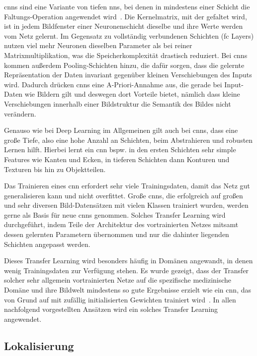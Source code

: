 \glspl{cnn} sind eine Variante von tiefen \glspl{nn}, bei denen in mindestens einer Schicht die Faltungs-Operation angewendet wird~\cite{Goodfellow.2016}.
Die Kernelmatrix, mit der gefaltet wird, ist in jedem Bildfenster einer Neuronenschicht dieselbe und ihre Werte werden vom Netz gelernt.
Im Gegensatz zu vollständig verbundenen Schichten (\gls{fc} Layers) nutzen viel mehr Neuronen dieselben Parameter als bei reiner Matrixmultiplikation, was die Speicherkomplexität drastisch reduziert.
Bei \glspl{cnn} kommen außerdem Pooling-Schichten hinzu, die dafür sorgen, dass die gelernte Repräsentation der Daten invariant gegenüber kleinen Verschiebungen des Inputs wird.
Dadurch drücken \glspl{cnn} eine A-Priori-Annahme aus, die gerade bei Input-Daten wie Bildern gilt und deswegen dort Vorteile bietet, nämlich dass kleine Verschiebungen innerhalb einer Bildstruktur die Semantik des Bildes nicht verändern.

Genauso wie bei Deep Learning im Allgemeinen gilt auch bei \glspl{cnn}, dass eine große Tiefe, also eine hohe Anzahl an Schichten, beim Abstrahieren und robusten Lernen hilft.
Hierbei lernt ein \gls{cnn} bspw. in den ersten Schichten sehr simple Features wie Kanten und Ecken, in tieferen Schichten dann Konturen und Texturen bis hin zu Objektteilen.

Das Trainieren eines \gls{cnn} erfordert sehr viele Trainingsdaten, damit das Netz gut generalisieren kann und nicht overfittet.
Große \glspl{cnn}, die erfolgreich auf großen und sehr diversen Bild-Datensätzen mit vielen Klassen trainiert wurden, werden gerne als Basis für neue \glspl{cnn} genommen.
Solches Transfer Learning wird durchgeführt, indem Teile der Architektur des vortrainierten Netzes mitsamt dessen gelernten Parametern übernommen und nur die dahinter liegenden Schichten angepasst werden.

Dieses Transfer Learning wird besonders häufig in Domänen angewandt, in denen wenig Trainingsdaten zur Verfügung stehen.
Es wurde gezeigt, dass der Transfer solcher sehr allgemein vortrainierten Netze auf die spezifische medizinische Domäne und ihre Bildwelt mindestens so gute Ergebnisse erzielt wie ein \gls{cnn}, das von Grund auf mit zufällig initialisierten Gewichten trainiert wird~\cite{Tajbakhsh.2016}.
In allen nachfolgend vorgestellten Ansätzen wird ein solches Transfer Learning angewendet.

\subsection{Lokalisierung}


